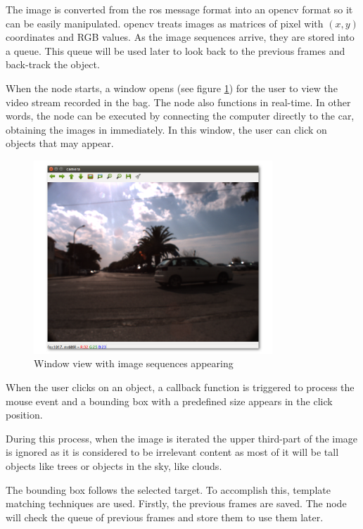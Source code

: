 The image is converted from the \gls{ros} message format into an \gls{opencv} format so it can be easily manipulated. \gls{opencv} treats images as matrices of pixel with $(x,y)$ coordinates and RGB values. As the image sequences arrive, they are stored into a queue. This queue will be used later to look back to the previous frames and back-track the object. 

When the node starts, a window opens (see figure \ref{fig:view}) for the user to view the video stream recorded in the bag. The node also functions in real-time. In other words, the node can be executed by connecting the computer directly to the car, obtaining the images in immediately. In this window, the user can click on objects that may appear. 


\begin{figure}[htp]
	
	\centering
	\includegraphics[width=0.8\textwidth]{caplabel/imgs/view.png}
	
	\caption{Window view with image sequences appearing}
	\label{fig:view}
	
\end{figure}

When the user clicks on an object, a callback function is triggered to process the mouse event and a bounding box with a predefined size appears in the click position.

During this process, when the image is iterated the upper third-part of the image is ignored as it is considered to be irrelevant content as most of it will be tall objects like trees or objects in the sky, like clouds.

The bounding box follows the selected target. To accomplish this, template matching techniques are used. Firstly, the previous frames are saved. The node will check the queue of previous frames and store them to use them later. 

